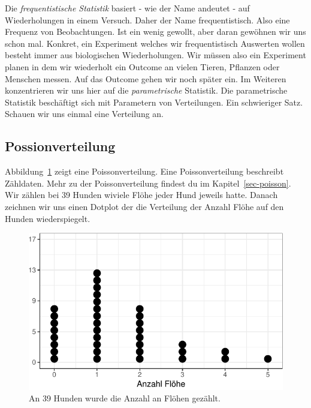 \documentclass[
  letterpaper,
  DIV=11,
  oneside]{scrreport}
\begin{document}
Die \emph{frequentistische Statistik} basiert - wie der Name andeutet -
auf Wiederholungen in einem Versuch. Daher der Name frequentistisch.
Also eine Frequenz von Beobachtungen. Ist ein wenig gewollt, aber daran
gewöhnen wir uns schon mal. Konkret, ein Experiment welches wir
frequentistisch Auswerten wollen besteht immer aus biologischen
Wiederholungen. Wir müssen also ein Experiment planen in dem wir
wiederholt ein Outcome an vielen Tieren, Pflanzen oder Menschen messen.
Auf das Outcome gehen wir noch später ein. Im Weiteren konzentrieren wir
uns hier auf die \emph{parametrische} Statistik. Die parametrische
Statistik beschäftigt sich mit Parametern von Verteilungen. Ein
schwieriger Satz. Schauen wir uns einmal eine Verteilung an.

\hypertarget{possionverteilung}{%
\subsection{Possionverteilung}\label{possionverteilung}}

Abbildung~\ref{fig-preface-pois-1} zeigt eine Poissonverteilung. Eine
Poissonverteilung beschreibt Zähldaten. Mehr zu der Poissonverteilung
findest du im Kapitel~\ref{sec-poisson}. Wir zählen bei 39 Hunden
wiviele Flöhe jeder Hund jeweils hatte. Danach zeichnen wir uns einen
Dotplot der die Verteilung der Anzahl Flöhe auf den Hunden
wiederspiegelt.

\begin{figure}

{\centering \includegraphics{./preface_files/figure-pdf/fig-preface-pois-1-1.pdf}

}

\caption{\label{fig-preface-pois-1}An 39 Hunden wurde die Anzahl an
Flöhen gezählt.}

\end{figure}
\end{document}
